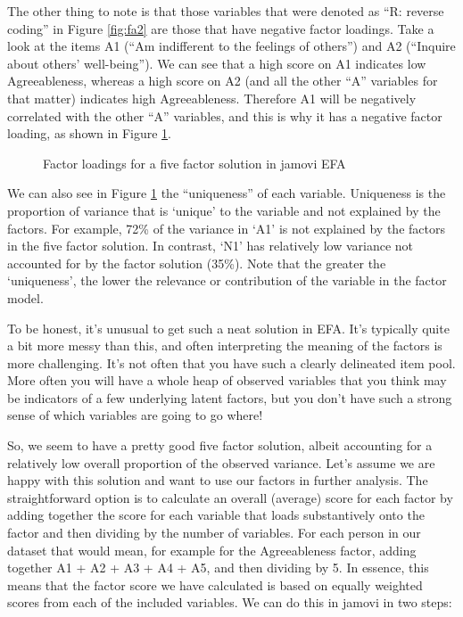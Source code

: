 The other thing to note is that those variables that were denoted as “R: reverse coding” in Figure \ref{fig:fa2} are those that have negative factor loadings. Take a look at the items A1 (“Am indifferent to the feelings of others”) and A2 (“Inquire about others' well-being”). We can see that a high score on A1 indicates low Agreeableness, whereas a high score on A2 (and all the other “A” variables for that matter) indicates high Agreeableness. Therefore A1 will be negatively correlated with the other “A” variables, and this is why it has a negative factor loading, as shown in Figure \ref{fig:fa7}. 

\begin{figure}[!htb]
\begin{center}
\caption{Factor loadings for a five factor solution in jamovi EFA}
\label{fig:fa7}
\HR
\end{center}
\end{figure}

We can also see in Figure \ref{fig:fa7} the “uniqueness” of each variable. Uniqueness is the proportion of variance that is ‘unique’ to the variable and not explained by the factors. For example, 72\% of the variance in ‘A1’ is not explained by the factors in the five factor solution. In contrast, ‘N1’ has relatively low variance not accounted for by the factor solution (35\%). Note that the greater the ‘uniqueness’, the lower the relevance or contribution of the variable in the factor model. 

To be honest, it’s unusual to get such a neat solution in EFA. It’s typically quite a bit more messy than this, and often interpreting the meaning of the factors is more challenging. It’s not often that you have such a clearly delineated item pool. More often you will have a whole heap of observed variables that you think may be indicators of a few underlying latent factors, but you don’t have such a strong sense of which variables are going to go where!

So, we seem to have a pretty good five factor solution, albeit accounting for a relatively low overall proportion of the observed variance. Let’s assume we are happy with this solution and want to use our factors in further analysis. The straightforward option is to calculate an overall (average) score for each factor by adding together the score for each variable that loads substantively onto the factor and then dividing by the number of variables. For each person in our dataset that would mean, for example for the Agreeableness factor, adding together A1 + A2 + A3 + A4 + A5, and then dividing by 5. In essence, this means that the factor score we have calculated is based on equally weighted scores from each of the included variables. We can do this in jamovi in two steps:


